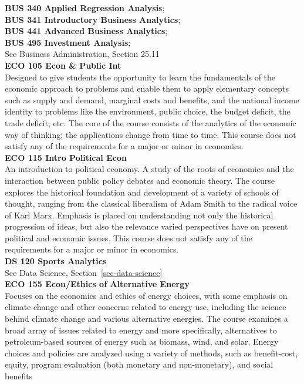 \documentclass[
  letterpaper,
]{scrbook}
\begin{document}
\textbf{BUS 340 Applied Regression Analysis};\\
\textbf{BUS 341 Introductory Business Analytics};\\
\textbf{BUS 441 Advanced Business Analytics};\\
\textbf{BUS 495 Investment Analysis};\\
See Business Administration, Section 25.11\\
\textbf{ECO 105 Econ \& Public Int}\\
Designed to give students the opportunity to learn the fundamentals of
the economic approach to problems and enable them to apply elementary
concepts such as supply and demand, marginal costs and benefits, and the
national income identity to problems like the environment, public
choice, the budget deficit, the trade deficit, etc. The core of the
course consists of the analytics of the economic way of thinking; the
applications change from time to time. This course does not satisfy any
of the requirements for a major or minor in economics.\\
\textbf{ECO 115 Intro Political Econ}\\
An introduction to political economy. A study of the roots of economics
and the interaction between public policy debates and economic theory.
The course explores the historical foundation and development of a
variety of schools of thought, ranging from the classical liberalism of
Adam Smith to the radical voice of Karl Marx. Emphasis is placed on
understanding not only the historical progression of ideas, but also the
relevance varied perspectives have on present political and economic
issues. This course does not satisfy any of the requirements for a major
or minor in economics.\\
\textbf{DS 120 Sports Analytics}\\
See Data Science, Section~\ref{sec-data-science}\\
\textbf{ECO 155 Econ/Ethics of Alternative Energy}\\
Focuses on the economics and ethics of energy choices, with some
emphasis on climate change and other concerns related to energy use,
including the science behind climate change and various alternative
energies. The course examines a broad array of issues related to energy
and more specifically, alternatives to petroleum-based sources of energy
such as biomass, wind, and solar. Energy choices and policies are
analyzed using a variety of methods, such as benefit-cost, equity,
program evaluation (both monetary and non-monetary), and social benefits
\end{document}

